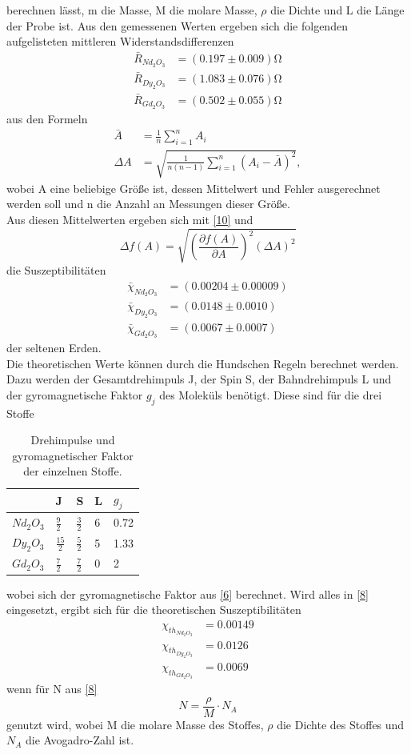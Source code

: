 \documentclass[a4paper]{scrartcl}
\begin{document}
berechnen lässt, m die Masse, M die molare Masse, $\rho$ die Dichte und L die Länge der Probe ist.
Aus den gemessenen Werten ergeben sich die folgenden aufgelisteten mittleren Widerstandsdifferenzen
\begin{align*}
  \bar R_{Nd_2 O_3}&=(0.197 \pm 0.009) \si{\ohm}\\
  \bar R_{Dy_2 O_3}&=(1.083 \pm 0.076) \si{\ohm}\\
  \bar R_{Gd_2 O_3}&=(0.502 \pm 0.055) \si{\ohm}
\end{align*}
aus den Formeln
\begin{align*}
  \bar A&=\frac{1}{n}\sum_{i=1}^n A_i\\
  \Delta A&=\sqrt{\frac{1}{n(n-1)}\sum_{i=1}^n (A_i - \bar A)^2},
  \label{fehler}
\end{align*}
wobei A eine beliebige Größe ist, dessen Mittelwert und Fehler ausgerechnet werden soll und n die Anzahl an Messungen dieser Größe.\\
Aus diesen Mittelwerten ergeben sich mit \eqref{10} und 
\begin{equation}
  \Delta f(A)=\sqrt{\left(\frac{\partial f(A)}{\partial A}\right)^2 (\Delta A)^2}
  \label{gauß}
\end{equation}
die Suszeptibilitäten 
\begin{align*}
  \bar \chi_{Nd_2 O_3}&=(0.00204 \pm 0.00009)\\
  \bar \chi_{Dy_2 O_3}&=(0.0148 \pm 0.0010)\\
  \bar \chi_{Gd_2 O_3}&=(0.0067 \pm 0.0007)
\end{align*}
der seltenen Erden.\\
Die theoretischen Werte können durch die Hundschen Regeln berechnet werden. Dazu werden der Gesamtdrehimpuls J, der Spin S, der Bahndrehimpuls L und der gyromagnetische Faktor $g_j$ des Moleküls benötigt. Diese sind für die drei Stoffe
\begin{table}[H]
  \centering
  \caption{Drehimpulse und gyromagnetischer Faktor der einzelnen Stoffe.}
  \begin{tabular}{l|l|l|l|l}
   & J & S & L & $g_j$\\ \hline
   $Nd_2 O_3$ & $\frac{9}{2}$ & $\frac{3}{2}$ & 6 & 0.72\\ \hline
   $Dy_2 O_3$ & $\frac{15}{2}$ & $\frac{5}{2}$ & 5 & 1.33\\ \hline
   $Gd_2 O_3$ & $\frac{7}{2}$ & $\frac{7}{2}$ & 0 & 2\\ \hline
   \end{tabular}
\end{table}
wobei sich der gyromagnetische Faktor aus \eqref{6} berechnet. Wird alles in \eqref{8} eingesetzt, ergibt sich für die theoretischen Suszeptibilitäten
\begin{align*}
  \chi_{th_{Nd_2 O_3}}&=0.00149\\
  \chi_{th_{Dy_2 O_3}}&=0.0126\\
  \chi_{th_{Gd_2 O_3}}&=0.0069
\end{align*}
wenn für N aus \eqref{8}
\begin{equation*}
  N=\frac{\rho}{M}\cdot N_{A}
\end{equation*}
genutzt wird, wobei M die molare Masse des Stoffes, $\rho$ die Dichte des Stoffes und $N_A$ die Avogadro-Zahl ist.
\end{document}
